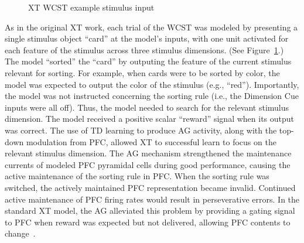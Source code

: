 \begin{figure}
  \begin{center}
  \end{center}
  \caption{XT WCST example stimulus input}
  \label{xt_wcst_stim}
\end{figure}

As in the original XT work, each trial of the WCST was modeled by presenting a single stimulus object ``card'' at the model's inputs, with one unit activated for each feature of the stimulus across three stimulus dimensions. (See Figure~\ref{xt_wcst_stim}.) The model ``sorted'' the ``card'' by outputing the feature of the current stimulus relevant for sorting. For example, when cards were to be sorted by color, the model was expected to output the color of the stimulus (e.g., ``red''). Importantly, the model was not instructed concerning the sorting rule (i.e., the Dimension Cue inputs were all off). Thus, the model needed to search for the relevant stimulus dimension. The model received a positive scalar ``reward'' signal when its output was correct. The use of TD learning to produce AG activity, along with the top-down modulation from PFC, allowed XT to successful learn to focus on the relevant stimulus dimension. The AG mechanism strengthened the maintenance currents of modeled PFC pyramidal cells during good performance, causing the active maintenance of the sorting rule in PFC. When the sorting rule was switched, the actively maintained PFC representation became invalid. Continued active maintenance of PFC firing rates would result in perseverative errors. In the standard XT model, the AG alleviated this problem by providing a gating signal to PFC when reward was expected but not delivered, allowing PFC contents to change~\cite{RougierNP:2005:XT}.

